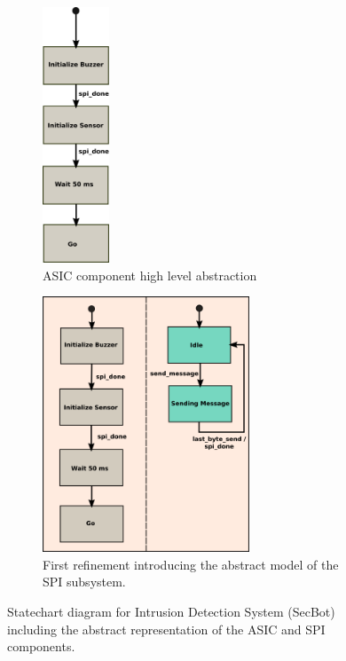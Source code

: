 \begin{figure}[t!]
	    \begin{subfigure}[t]{0.5\textwidth}
	        \begin{centering}
	        \includegraphics[height=3in]{figures/ASIC}
	        \caption{ASIC component high level abstraction}
	        \label{fig:ASIC}
	        \end{centering}
	    \end{subfigure}
\qquad
	    \begin{subfigure}[t]{0.5\textwidth}
	        \includegraphics[height=3in]{figures/ASIC&SPI_1}
	        \caption{First refinement introducing the abstract model of the SPI subsystem.}
	        \label{fig:ASIC_SPI_1}
	    \end{subfigure}
	    \caption{Statechart diagram for Intrusion Detection System (SecBot) including the abstract representation of the ASIC and SPI components.}
\end{figure}


